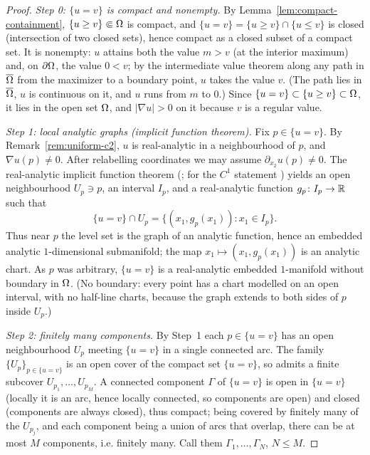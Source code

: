 \begin{proof}
\emph{Step 0: $\{u=v\}$ is compact and nonempty.}
By Lemma~\ref{lem:compact-containment}, $\{u\ge v\}\Subset\Omega$ is compact, and
$\{u=v\}=\{u\ge v\}\cap\{u\le v\}$ is closed (intersection of two closed sets),
hence compact as a closed subset of a compact set. It is nonempty: $u$ attains
both the value $m>v$ (at the interior maximum) and, on $\partial\Omega$, the value
$0<v$; by the intermediate value theorem along any path in $\overline{\Omega}$ from
the maximizer to a boundary point, $u$ takes the value $v$. (The path lies in
$\overline{\Omega}$, $u$ is continuous on it, and $u$ runs from $m$ to $0$.)
Since $\{u=v\}\subset\{u\ge v\}\subset\Omega$, it lies in the open set $\Omega$, and
$|\nabla u|>0$ on it because $v$ is a regular value.

\emph{Step 1: local analytic graphs (implicit function theorem).}
Fix $p\in\{u=v\}$. By Remark~\ref{rem:uniform-c2}, $u$ is real-analytic in a
neighbourhood of $p$, and $\nabla u(p)\ne0$. After relabelling coordinates we
may assume $\partial_{x_2}u(p)\ne0$. The real-analytic implicit function
theorem (\cite[Theorem~6.1.2]{KrantzParks2002}; for the $C^1$ statement
\cite[\S0.3 and Appendix]{GT1983}) yields an open neighbourhood
$U_p\ni p$, an interval $I_p$, and a real-analytic function
$g_p\colon I_p\to\mathbb{R}$ such that
\[
  \{u=v\}\cap U_p=\{(x_1,g_p(x_1)):x_1\in I_p\}.
\]
Thus near $p$ the level set is the graph of an analytic function, hence an
embedded analytic $1$-dimensional submanifold; the map $x_1\mapsto(x_1,g_p(x_1))$
is an analytic chart. As $p$ was arbitrary, $\{u=v\}$ is a real-analytic
embedded $1$-manifold without boundary in $\Omega$. (No boundary: every point has
a chart modelled on an open interval, with no half-line charts, because the
graph extends to both sides of $p$ inside $U_p$.)

\emph{Step 2: finitely many components.}
By Step~1 each $p\in\{u=v\}$ has an open neighbourhood $U_p$ meeting $\{u=v\}$
in a single connected arc. The family $\{U_p\}_{p\in\{u=v\}}$ is an open cover
of the compact set $\{u=v\}$, so admits a finite subcover
$U_{p_1},\dots,U_{p_M}$. A connected component $\Gamma$ of $\{u=v\}$ is open
in $\{u=v\}$ (locally it is an arc, hence locally connected, so components are
open) and closed (components are always closed), thus compact; being covered by
finitely many of the $U_{p_j}$, and each component being a union of arcs that
overlap, there can be at most $M$ components, i.e. finitely many. Call them
$\Gamma_1,\dots,\Gamma_N$, $N\le M$.


\end{proof}

